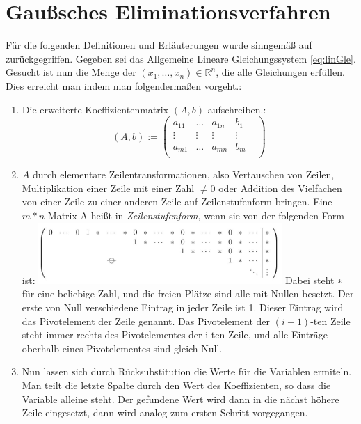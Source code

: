 \documentclass[a4paper, 12pt]{report}
\begin{document}
\begin{sloppypar}
\section{Gaußsches Eliminationsverfahren} \label{2.2}
Für die folgenden Definitionen und Erläuterungen wurde sinngemäß auf \cite{fischer14} zurückgegriffen. \newline
Gegeben sei das Allgemeine Lineare Gleichungssystem \ref{eq:linGle}. Gesucht ist nun die Menge der $ (x_1, \hdots ,x_n ) \in \mathbb{R}^n $, die alle Gleichungen erfüllen.
Dies erreicht man indem man folgendermaßen vorgeht.:
\begin{enumerate}
    \item Die erweiterte Koeffizientenmatrix $ (A, b) $ aufschreiben.:
        \begin{equation}
            (A, b):=
            \begin{pmatrix}
                a_{11} & \hdots &  a_{1n} &  b_1  \\
                \vdots & \vdots &  \vdots & \vdots &  \\
                a_{m1} &  \hdots &  a_{mn} &  b_m \\
            \end{pmatrix}
        \end{equation}
    \item $A$ durch elementare Zeilentransformationen, also Vertauschen von Zeilen, Multiplikation einer Zeile mit einer Zahl $\neq 0 $ oder Addition des Vielfachen von einer Zeile zu einer anderen Zeile auf Zeilenstufenform bringen.
        Eine $ m * n $-Matrix A heißt in \textit{Zeilenstufenform}, wenn sie von der folgenden Form ist: \newline \newline
        \includegraphics[width=350px]{"./Zeilenstufenform.jpeg"} \newline \newline
        Dabei steht ∗ für eine beliebige Zahl, und die freien Plätze sind alle mit Nullen besetzt. Der erste von Null verschiedene Eintrag in jeder Zeile ist 1. Dieser Eintrag wird das Pivotelement der Zeile genannt.
        Das Pivotelement der $(i + 1)$-ten Zeile steht immer rechts des Pivotelementes der i-ten Zeile, und alle Einträge oberhalb eines Pivotelementes sind gleich Null.
    \item Nun lassen sich durch Rücksubstitution die Werte für die Variablen ermiteln. Man teilt die letzte Spalte durch den Wert des Koeffizienten, so dass die Variable alleine steht.
          Der gefundene Wert wird dann in die nächst höhere Zeile eingesetzt, dann wird analog zum ersten Schritt vorgegangen.
\end{enumerate}




\end{sloppypar}
\end{document}
